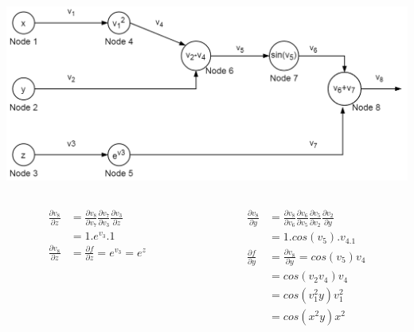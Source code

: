 \begin{frame}{}
	\includegraphics[width=.7\textwidth, center]{figuras/backprop_eg1.png}
	\begin{columns}[T]
		\begin{column}{.5\textwidth}
			\begin{align}
					\frac{\partial v_8}{\partial z}&= 
					\frac{\partial v_8}{\partial v_7} 
					\frac{\partial v_7}{\partial v_3} 
					\frac{\partial v_3}{\partial z}  \\
					&= 1.e^{v_3}.1 \\
					\frac{\partial v_8}{\partial z}&=\frac{\partial f}{\partial z} 
					= e^{v_3}=e^z 
			\end{align}
		\end{column}
		\begin{column}{.5\textwidth}
			\begin{align}
			\frac{\partial v_8}{\partial y}&= 
			\frac{\partial v_8}{\partial v_6} 
			\frac{\partial v_6}{\partial v_5} 
			\frac{\partial v_5}{\partial v_2}  
			\frac{\partial v_2}{\partial y}\\
			& = 1.cos(v_5).v_4.1 \\
			\frac{\partial f}{\partial y}&=\frac{\partial v_8}{\partial y}
			= cos(v_5)v_4 \\
			&= cos(v_2v_4)v_4 \\
			&= cos(v^2_1y)v^2_1 \\
			&= cos(x^2y)x^2
			\end{align}
		\end{column}
	\end{columns}
\end{frame}

